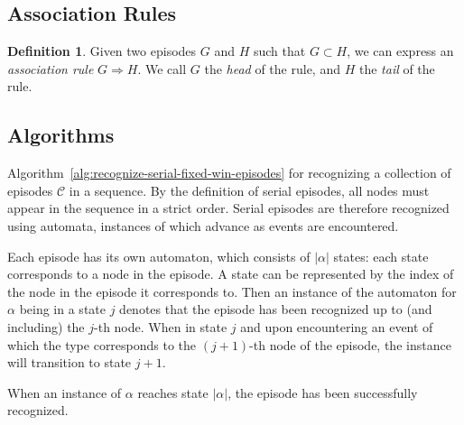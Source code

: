 \documentclass{scrartcl}
\theoremstyle{definition}
\newtheorem{definition}{Definition}
\begin{document}
\subsection{Association Rules}
\begin{definition}
Given two episodes $ G $ and $ H $ such that $ G \subset H $, we can express an \emph{association rule} $ G \Rightarrow H $. We call $ G $ the \emph{head} of the rule, and $ H $ the \emph{tail} of the rule.
\end{definition}

\subsection{Algorithms}

Algorithm~\ref{alg:recognize-serial-fixed-win-episodes} for recognizing a collection of episodes $ \mathcal{C} $ in a sequence. By the definition of serial episodes, all nodes must appear in the sequence in a strict order. Serial episodes are therefore recognized using automata, instances of which advance as events are encountered.

Each episode has its own automaton, which consists of $ | \alpha | $ states: each state corresponds to a node in the episode. A state can be represented by the index of the node in the episode it corresponds to. Then an instance of the automaton for $ \alpha $ being in a state $ j $ denotes that the episode has been recognized up to (and including) the $ j $-th node. When in state $ j $ and upon encountering an event of which the type corresponds to the $ (j + 1) $-th node of the episode, the instance will transition to state $ j + 1 $.

When an instance of $ \alpha $ reaches state $ | \alpha | $, the episode has been successfully recognized.
\end{document}

